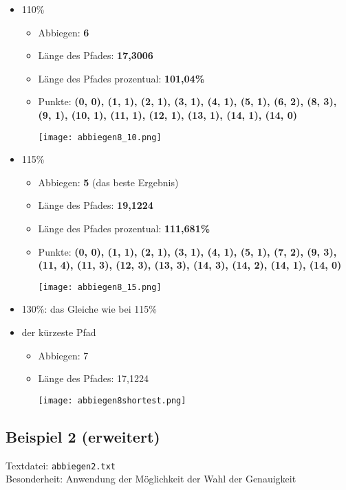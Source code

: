 \documentclass[a4paper,10pt,ngerman]{scrartcl}
\begin{document}
\begin{itemize}
  \item 110\%    
    \begin{itemize}
      \item Abbiegen: \textbf{6}
      \item Länge des Pfades: \textbf{17,3006}
      \item Länge des Pfades prozentual: \textbf{101,04\%}
      \item Punkte: \textbf{(0, 0), (1, 1), (2, 1), (3, 1), (4, 1), (5, 1), (6, 2), (8, 3), (9, 1), (10, 1), (11, 1), (12, 1), (13, 1), (14, 1), (14, 0)}
\begin{center}
\texttt{[image: abbiegen8\_10.png]}
\end{center}
  \end{itemize}
  \item 115\%    
    \begin{itemize}
      \item Abbiegen: \textbf{5} (das beste Ergebnis)
      \item Länge des Pfades: \textbf{19,1224}
      \item Länge des Pfades prozentual: \textbf{111,681\%}
      \item Punkte: \textbf{(0, 0), (1, 1), (2, 1), (3, 1), (4, 1), (5, 1), (7, 2), (9, 3), (11, 4), (11, 3), (12, 3), (13, 3), (14, 3), (14, 2), (14, 1), (14, 0)}
\begin{center}
\texttt{[image: abbiegen8\_15.png]}
\end{center}
  \end{itemize}
  \item 130\%: das Gleiche wie bei 115\%
  \item der kürzeste Pfad   
    \begin{itemize}
      \item Abbiegen: 7
      \item Länge des Pfades: 17,1224
\begin{center}
\texttt{[image: abbiegen8shortest.png]}
\end{center}
    \end{itemize}
\end{itemize}

\subsection{Beispiel 2 (erweitert)}\label{genauigkeit}
Textdatei: \texttt{abbiegen2.txt}\\
Besonderheit: Anwendung der Möglichkeit der Wahl der Genauigkeit
\end{document}
